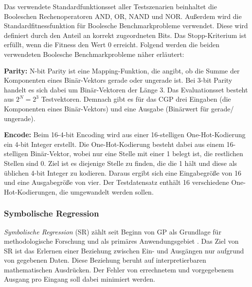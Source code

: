 Das verwendete Standardfunktionsset aller Testszenarien beinhaltet die Booleschen Rechenoperatoren AND, OR, NAND und NOR.
Außerdem wird die Standardfitnessfunktion für Boolesche Benchmarkprobleme verwendet.
Diese wird definiert durch den Anteil an korrekt zugeordneten Bits. \cite{cui_equidistant_2023}
Das Stopp-Kriterium ist erfüllt, wenn die Fitness den Wert 0 erreicht.
Folgend werden die beiden verwendeten Boolesche Benchmarkprobleme näher erläutert:

\textbf{Parity:} N-bit Parity ist eine Mapping-Funktion, die angibt, ob die Summe der Komponenten eines Binär-Vektors gerade oder ungerade ist.
Bei 3-bit Parity handelt es sich dabei um Binär-Vektoren der Länge 3.
Das Evaluationsset besteht aus $2^N=2^3$ Testvektoren. \cite{hohil_1999}
Demnach gibt es für das CGP drei Eingaben (die Komponenten eines Binär-Vektors) und eine Ausgabe (Binärwert für \glqq gerade\grqq\space / \glqq ungerade\grqq).

\textbf{Encode:} Beim 16-4-bit Encoding wird aus einer 16-stelligen One-Hot-Kodierung ein 4-bit Integer erstellt.
Die One-Hot-Kodierung besteht dabei aus einem 16-stelligen Binär-Vektor, wobei nur eine Stelle mit einer 1 belegt ist, die restlichen Stellen sind 0.
Ziel ist es diejenige Stelle zu finden, die die 1 hält und diese als üblichen 4-bit Integer zu kodieren. \cite{cui_weighted_mutation, goldman_2015}
Daraus ergibt sich eine Eingabegröße von 16 und eine Ausgabegröße von vier.
Der Testdatensatz enthält 16 verschiedene One-Hot-Kodierungen, die umgewandelt werden sollen.


\subsubsection{Symbolische Regression}
\label{subsubsec:symbolicRegression}

\emph{Symbolische Regression} (SR) zählt seit Beginn von GP als Grundlage für methodologische Forschung und als primäres Anwendungsgebiet \cite{orzechowski}.
Das Ziel von SR ist das Erlernen einer Beziehung zwischen Ein- und Ausgängen nur aufgrund von gegebenen Daten.
Diese Beziehung beruht auf interpretierbaren mathematischen Ausdrücken.
Der Fehler von errechnetem und vorgegebenem Ausgang pro Eingang soll dabei minimiert werden. \cite{makke_interpretable_2024}

